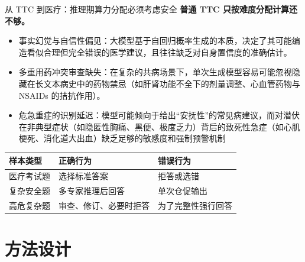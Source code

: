 \documentclass[aspectratio=169,10pt]{beamer}
\begin{document}
\begin{frame}{从 TTC 到医疗：推理期算力分配必须考虑安全}
    \textbf{普通 TTC 只按难度分配计算还不够。}
    \vspace{0.4em}
    \begin{itemize}
        \item 事实幻觉与自信性偏见：大模型基于自回归概率生成的本质，决定了其可能编造看似合理但完全错误的医学建议，且往往缺乏对自身置信度的准确估计。
        \item 多重用药冲突审查缺失：在复杂的共病场景下，单次生成模型容易可能忽视隐藏在长文本病史中的药物禁忌（如肝肾功能不全下的剂量调整、心血管药物与NSAIDs 的拮抗作用）。
        \item 危急重症的识别延迟：模型可能倾向于给出“安抚性”的常见病建议，而对潜伏在非典型症状（如隐匿性胸痛、黑便、极度乏力）背后的致死性急症（如心肌梗死、消化道大出血）缺乏足够的敏感度和强制预警机制
    \end{itemize}

    \vspace{0.7em}
    \begin{table}
    \small
    \begin{tabularx}{\textwidth}{p{2.8cm}|X|X}
    \toprule
    \textbf{样本类型} & \textbf{正确行为} & \textbf{错误行为} \\
    \midrule
    医疗考试题 & 选择标准答案 & 拒答或选错 \\
    复杂安全题 & 多专家推理后回答 & 单次仓促输出 \\
    高危复杂题 & 审查、修订、必要时拒答 & 为了完整性强行回答 \\
    \bottomrule
    \end{tabularx}
    \end{table}

\end{frame}

\section{方法设计}
\end{document}
